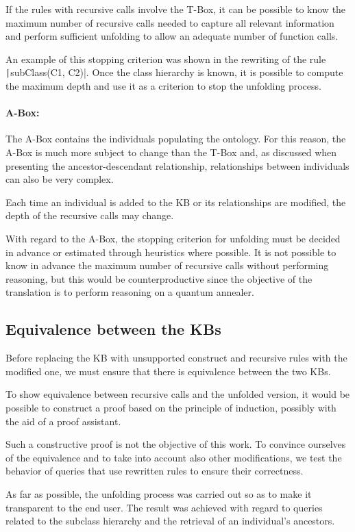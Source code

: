 If the rules with recursive calls involve the T-Box, it can be possible to know the maximum number of recursive calls needed to capture all relevant information and perform sufficient unfolding to allow an adequate number of function calls.

An example of this stopping criterion was shown in the rewriting of the rule \texttt|subClass(C1, C2)|. Once the class hierarchy is known, it is possible to compute the maximum depth and use it as a criterion to stop the unfolding process.

\paragraph{A-Box:} The A-Box contains the individuals populating the ontology. For this reason, the A-Box is much more subject to change than the T-Box and, as discussed when presenting the ancestor-descendant relationship, relationships between individuals can also be very complex.

Each time an individual is added to the KB or its relationships are modified, the depth of the recursive calls may change.

With regard to the A-Box, the stopping criterion for unfolding must be decided in advance or estimated through heuristics where possible. It is not possible to know in advance the maximum number of recursive calls without performing reasoning, but this would be counterproductive since the objective of the translation is to perform reasoning on a quantum annealer.

\subsection{Equivalence between the KBs}
Before replacing the KB with unsupported construct and recursive rules with the modified one, we must ensure that there is equivalence between the two KBs. 

To show equivalence between recursive calls and the unfolded version, it would be possible to construct a proof based on the principle of induction, possibly with the aid of a proof assistant.

Such a constructive proof is not the objective of this work. To convince ourselves of the equivalence and to take into account also other modifications, we test the behavior of queries that use rewritten rules to ensure their correctness.

As far as possible, the unfolding process was carried out so as to make it transparent to the end user. The result was achieved with regard to queries related to the subclass hierarchy and the retrieval of an individual's ancestors.

